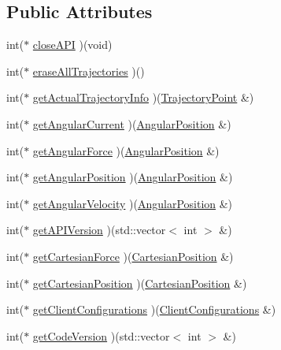 \subsection*{Public Attributes}
\begin{DoxyCompactItemize}
\item 
int($\ast$ \hyperlink{classjaco_1_1JacoAPI_a941453ebf5242c5adad823c0636f930f}{close\+A\+PI} )(void)
\item 
int($\ast$ \hyperlink{classjaco_1_1JacoAPI_a97db09d91923328b1780bb50a0e2548d}{erase\+All\+Trajectories} )()
\item 
int($\ast$ \hyperlink{classjaco_1_1JacoAPI_af2f83a5e6bef4f10dc4c7d714a593e4c}{get\+Actual\+Trajectory\+Info} )(\hyperlink{structTrajectoryPoint}{Trajectory\+Point} \&)
\item 
int($\ast$ \hyperlink{classjaco_1_1JacoAPI_ac24c226ba8ee3b72618a84eaab9d722a}{get\+Angular\+Current} )(\hyperlink{KinovaTypes_8h_de/de7/structAngularPosition}{Angular\+Position} \&)
\item 
int($\ast$ \hyperlink{classjaco_1_1JacoAPI_aea22577840f066fb2d5da409e50f9760}{get\+Angular\+Force} )(\hyperlink{KinovaTypes_8h_de/de7/structAngularPosition}{Angular\+Position} \&)
\item 
int($\ast$ \hyperlink{classjaco_1_1JacoAPI_a8d2e9b00c5953e3fc024f86e128f01df}{get\+Angular\+Position} )(\hyperlink{KinovaTypes_8h_de/de7/structAngularPosition}{Angular\+Position} \&)
\item 
int($\ast$ \hyperlink{classjaco_1_1JacoAPI_af50f11de8f7c2b661f53d76f576eb3ae}{get\+Angular\+Velocity} )(\hyperlink{KinovaTypes_8h_de/de7/structAngularPosition}{Angular\+Position} \&)
\item 
int($\ast$ \hyperlink{classjaco_1_1JacoAPI_a90f1033a1174ea7f97d48186b7ca867a}{get\+A\+P\+I\+Version} )(std\+::vector$<$ int $>$ \&)
\item 
int($\ast$ \hyperlink{classjaco_1_1JacoAPI_af82e531abda1dd3e87ab33f1f5474ca5}{get\+Cartesian\+Force} )(\hyperlink{structCartesianPosition}{Cartesian\+Position} \&)
\item 
int($\ast$ \hyperlink{classjaco_1_1JacoAPI_a6c3640d554617754a9ed2e875b1a2cd0}{get\+Cartesian\+Position} )(\hyperlink{structCartesianPosition}{Cartesian\+Position} \&)
\item 
int($\ast$ \hyperlink{classjaco_1_1JacoAPI_a215a64d2dee8b2555d317da41e25ae16}{get\+Client\+Configurations} )(\hyperlink{KinovaTypes_8h_d1/d2e/structClientConfigurations}{Client\+Configurations} \&)
\item 
int($\ast$ \hyperlink{classjaco_1_1JacoAPI_ab2e6426177bd24cd1a381f0f1a9d277a}{get\+Code\+Version} )(std\+::vector$<$ int $>$ \&)

\end{DoxyCompactItemize}
